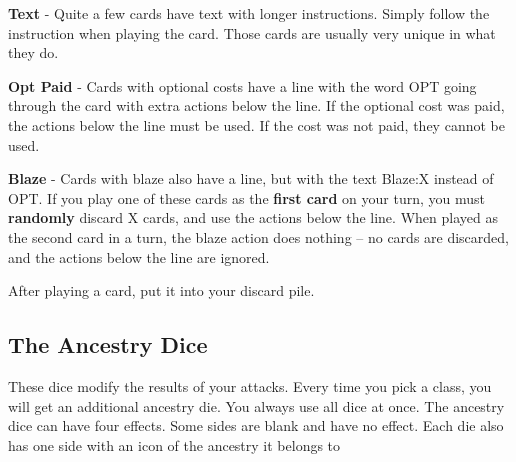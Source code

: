 \textbf{Text} - Quite a few cards have text with longer instructions. Simply follow the instruction when playing the card. Those cards are usually very unique in what they do.


\textbf{Opt Paid} - Cards with optional costs have a line with the word OPT going through the card with extra actions below the line.
If the optional cost was paid, the actions below the line must be used. If the cost was not paid, they cannot be used.

\textbf{Blaze \symBlaze} - Cards with blaze also have a line, but with the text Blaze:X instead of OPT.
If you play one of these cards as the  \textbf{first card} on your turn, you must \textbf{randomly} discard X cards, and use the actions below the line.
When played as the second card in a turn, the blaze action does nothing -- no cards are discarded, and the actions below the line are ignored.

\begin{tcolorbox}[colframe=black, colback=white]
	After playing a card, put it into your discard pile.
	
\end{tcolorbox}




\subsection{The Ancestry Dice}
These dice modify the results of your \symAttack attacks.
Every time you pick a class, you will get an additional ancestry die. You always use all dice at once.
The ancestry dice can have four effects. Some sides are blank and have no effect. Each die also has one side with an icon of the ancestry it belongs to

